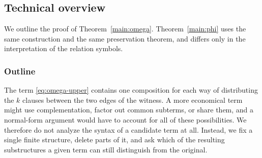 \subsection{Technical overview}\label{sec:overview}
We outline the proof of Theorem~\ref{main:omega}. Theorem~\ref{main:phi}
uses the same construction and the same preservation theorem, and differs
only in the interpretation of the relation symbols.

\subsubsection{Outline}\label{ov:outline}
The term \eqref{eq:omega-upper} contains one composition for each way of
distributing the $k$ clauses between the two edges of the witness. A more
economical term might use complementation, factor out common subterms, or
share them, and a normal-form argument would have to account for all of
these possibilities. We therefore do not analyze the syntax of a candidate
term at all. Instead, we fix a single finite structure, delete parts of it,
and ask which of the resulting substructures a given term can still
distinguish from the original.

